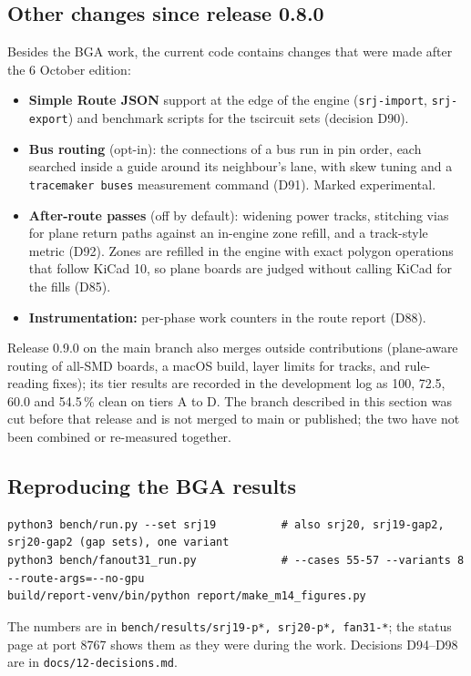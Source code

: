 \documentclass[10pt,a4paper]{article}
\begin{document}
\subsection{Other changes since release 0.8.0}

Besides the BGA work, the current code contains changes that were made after the 6 October edition:
\begin{itemize}[leftmargin=*]
  \item \textbf{Simple Route JSON} support at the edge of the engine (\texttt{srj-import}, \texttt{srj-export}) and
  benchmark scripts for the tscircuit sets (decision D90).
  \item \textbf{Bus routing} (opt-in): the connections of a bus run in pin order, each searched inside a guide around its
  neighbour's lane, with skew tuning and a \texttt{tracemaker buses} measurement command (D91). Marked experimental.
  \item \textbf{After-route passes} (off by default): widening power tracks, stitching vias for plane return paths against an
  in-engine zone refill, and a track-style metric (D92). Zones are refilled in the engine with exact polygon operations
  that follow KiCad 10, so plane boards are judged without calling KiCad for the fills (D85).
  \item \textbf{Instrumentation:} per-phase work counters in the route report (D88).
\end{itemize}
Release 0.9.0 on the main branch also merges outside contributions (plane-aware routing of all-SMD boards, a macOS
build, layer limits for tracks, and rule-reading fixes); its tier results are recorded in the development log as
100, 72.5, 60.0 and 54.5\,\% clean on tiers A to D. The branch described in this section was cut before that release and is not
merged to main or published; the two have not been combined or re-measured together.

\subsection{Reproducing the BGA results}

\begin{small}
\begin{verbatim}
python3 bench/run.py --set srj19          # also srj20, srj19-gap2, srj20-gap2 (gap sets), one variant
python3 bench/fanout31_run.py             # --cases 55-57 --variants 8 --route-args=--no-gpu
build/report-venv/bin/python report/make_m14_figures.py
\end{verbatim}
\end{small}
The numbers are in \texttt{bench/results/srj19-p*, srj20-p*, fan31-*}; the status page at port 8767 shows them as they
were during the work. Decisions D94--D98 are in \texttt{docs/12-decisions.md}.
\end{document}
